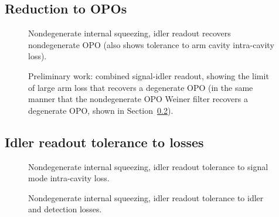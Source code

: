 

\subsection{Reduction to OPOs}


\begin{figure}
	\centering
	\caption{Nondegenerate internal squeezing, idler readout recovers nondegenerate OPO (also shows tolerance to arm cavity intra-cavity loss).}
	\label{fig:}
\end{figure}

\begin{figure}
	\centering
	\caption{Preliminary work: combined signal-idler readout, showing the limit of large arm loss that recovers a degenerate OPO (in the same manner that the nondegenerate OPO Weiner filter recovers a degenerate OPO, shown in Section~\ref{}).}
	\label{fig:}
\end{figure}


\subsection{Idler readout tolerance to losses}


\begin{figure}
	\centering
	\caption{Nondegenerate internal squeezing, idler readout tolerance to signal mode intra-cavity loss.}
	\label{fig:}
\end{figure}

\begin{figure}
	\centering
	\caption{Nondegenerate internal squeezing, idler readout tolerance to idler and detection losses.}
	\label{fig:}
\end{figure}


